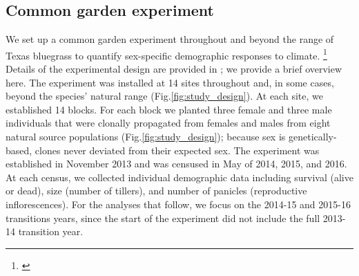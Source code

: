 \documentclass[12pt]{article}\usepackage[]{graphicx}\usepackage[dvipsnames]{xcolor}
\newcommand{\tom}[2]{{\color{red}{#1}}\footnote{\textit{\color{red}{#2}}}}
\begin{document}
\subsection*{Common garden experiment}
We set up a common garden experiment throughout and beyond the range of Texas bluegrass to quantify sex-specific demographic responses to climate. 
\tom{The novelty of this study lies in the fact that we use a precise climate variable to build a mechanistic model to forecast the response of species to climate change.}{This is not relevant to the description of the experiment.}
Details of the experimental design are provided in \cite{miller2022two}; we provide a brief overview here. 
The experiment was installed at 14 sites throughout and, in some cases, beyond the species' natural range (Fig.\ref{fig:study_design}).
At each site, we established 14 blocks. 
For each block we planted three female and three male individuals that were clonally propagated from females and males from eight natural source populations (Fig.\ref{fig:study_design}); because sex is genetically-based, clones never deviated from their expected sex. 
The experiment was established in November 2013 and was censused in May of 2014, 2015, and 2016. 
At each census, we collected individual demographic data including survival (alive or dead), size (number of tillers), and number of panicles (reproductive inflorescences). 
For the analyses that follow, we focus on the 2014-15 and 2015-16 transitions years, since the start of the experiment did not include the full 2013-14 transition year.
\end{document}
